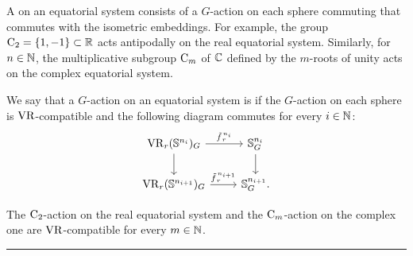 A  on an equatorial system consists of a \(G\)-action on each sphere commuting that commutes with the isometric embeddings.
For example, the group \(\mathrm{C}_2 = \{1,-1\} \subset \mathbb{R}\) acts antipodally on the real equatorial system.
Similarly, for \(n \in \mathbb{N}\), the multiplicative subgroup \(\mathrm{C}_m\) of \(\mathbb{C}\) defined by the \(m\)-roots of unity acts on the complex equatorial system.

We say that a \(G\)-action on an equatorial system is  if the \(G\)-action on each sphere is \(\operatorname{VR}\)-compatible and the following diagram commutes for every \(i \in \mathbb{N}\):
\[
\begin{tikzcd}
	\VR_r(\bS^{n_i})_G
	\ar[d]
	\ar[r, "\tilde f_{\,r}^{\,n_i}" above]
	&
	\bS^{n_i}_G
	\ar[d]
	\\
	\VR_r(\bS^{n_{i+1}})_G
	\ar[r, "\tilde f_{\,r}^{\,n_{i+1}}" above]
	&
	\bS^{n_{i+1}}_G.
\end{tikzcd}
\]


\lemma The \(\mathrm{C}_2\)-action on the real equatorial system and the \(\mathrm{C}_m\)-action on the complex one are \(\operatorname{VR}\)-compatible for every \(m \in \mathbb{N}\).


\noindent\rule{\textwidth}{0.4pt}

